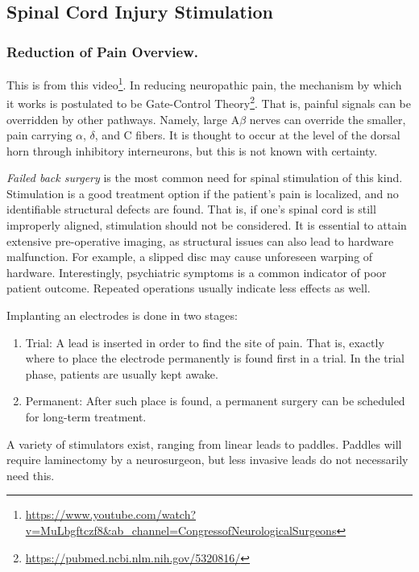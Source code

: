 \documentclass[12pt]{report}
\begin{document}
\subsection{Spinal Cord Injury Stimulation}

\subsubsection{Reduction of Pain Overview.}
This is from this video\footnote{\url{https://www.youtube.com/watch?v=MuLbgftczf8\&ab_channel=CongressofNeurologicalSurgeons}}. In reducing neuropathic pain, the mechanism by which it works is postulated to be Gate-Control Theory\footnote{\url{https://pubmed.ncbi.nlm.nih.gov/5320816/}}. That is, painful signals can be overridden by other pathways. Namely, large A$\beta$ nerves can override the smaller, pain carrying $\alpha$, $\delta$, and C fibers. It is thought to occur at the level of the dorsal horn through inhibitory interneurons, but this is not known with certainty.\newline

\textit{Failed back surgery} is the most common need for spinal stimulation of this kind. Stimulation is a good treatment option if the patient's pain is localized, and no identifiable structural defects are found. That is, if one's spinal cord is still improperly aligned, stimulation should not be considered. It is essential to attain extensive pre-operative imaging, as structural issues can also lead to hardware malfunction. For example, a slipped disc may cause unforeseen warping of hardware. Interestingly, psychiatric symptoms is a common indicator of poor patient outcome. Repeated operations usually indicate less effects as well.\newline

Implanting an electrodes is done in two stages:
\begin{enumerate}
    \item Trial: A lead is inserted in order to find the site of pain. That is, exactly where to place the electrode permanently is found first in a trial. In the trial phase, patients are usually kept awake. 
    \item Permanent: After such place is found, a permanent surgery can be scheduled for long-term treatment. 
\end{enumerate}

A variety of stimulators exist, ranging from linear leads to paddles. Paddles will require laminectomy by a neurosurgeon, but less invasive leads do not necessarily need this.\newline
\end{document}
